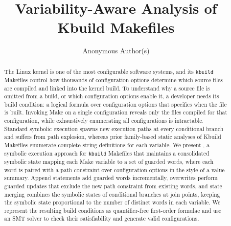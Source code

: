 \documentclass[acmsmall,screen,review,anonymous,nonacm]{acmart}
\begin{document}


\title{Variability-Aware Analysis of Kbuild Makefiles}

\author{Anonymous Author(s)}
\renewcommand{\shortauthors}{Anonymous Author(s)}

\begin{abstract}
  The Linux kernel is one of the most configurable software systems, and its \texttt{kbuild} Makefiles control how thousands of configuration options determine which source files are compiled and linked into the kernel build.
  To understand why a source file is omitted from a build, or which configuration options enable it, a developer needs its build condition: a logical formula over configuration options that specifies when the file is built.
  Invoking Make on a single configuration reveals only the files compiled for that configuration, while exhaustively enumerating all configurations is intractable.
  Standard symbolic execution spawns new execution paths at every conditional branch and suffers from path explosion, whereas prior family-based static analyses of Kbuild Makefiles enumerate complete string definitions for each variable.
  We present \tool{}, a symbolic execution approach for \texttt{kbuild} Makefiles that maintains a consolidated symbolic state mapping each Make variable to a set of guarded words, where each word is paired with a path constraint over configuration options in the style of a value summary.
  Append statements add guarded words incrementally, overwrites perform guarded updates that exclude the new path constraint from existing words, and state merging combines the symbolic states of conditional branches at join points, keeping the symbolic state proportional to the number of distinct words in each variable.
  We represent the resulting build conditions as quantifier-free first-order formulae and use an SMT solver to check their satisfiability and generate valid configurations.

\end{abstract}
\end{document}
